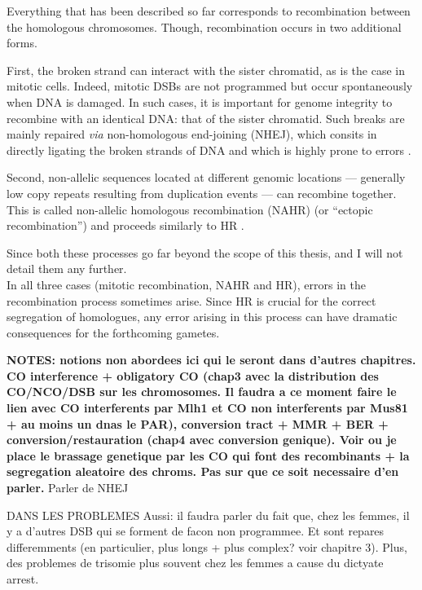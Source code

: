 Everything that has been described so far corresponds to recombination between the homologous chromosomes. 
Though, recombination occurs in two additional forms.

First, the broken strand can interact with the sister chromatid, as is the case in mitotic cells. 
Indeed, mitotic DSBs are not programmed but occur spontaneously when DNA is damaged.
In such cases, it is important for genome integrity to recombine with an identical DNA\@: that of the sister chromatid. 
Such breaks are mainly repaired \textit{via} non-homologous end-joining (NHEJ), which consits in directly ligating the broken strands of DNA \citep{weterings2004mechanism} and which is highly prone to errors \citep{smith2001influence}.

Second, non-allelic sequences located at different genomic locations — generally low copy repeats resulting from duplication events \citep{bailey2006primate} — can recombine together. 
This is called non-allelic homologous recombination (NAHR) (or “ectopic recombination”) and proceeds similarly to HR \citep{sasaki2010genome}.

Since both these processes go far beyond the scope of this thesis, and I will not detail them any further.\\

In all three cases (mitotic recombination, NAHR and HR), errors in the recombination process sometimes arise. 
Since HR is crucial for the correct segregation of homologues, any error arising in this process can have dramatic consequences for the forthcoming gametes.




\textbf{NOTES\@: notions non abordees ici qui le seront dans d'autres chapitres. CO interference + obligatory CO (chap3 avec la distribution des CO/NCO/DSB sur les chromosomes. Il faudra a ce moment faire le lien avec CO interferents par Mlh1 et CO non interferents par Mus81 + au moins un dnas le PAR), conversion tract + MMR + BER + conversion/restauration (chap4 avec conversion genique). Voir ou je place le brassage genetique par les CO qui font des recombinants + la segregation aleatoire des chroms. Pas sur que ce soit necessaire d'en parler.}
Parler de NHEJ



DANS LES PROBLEMES
Aussi: il faudra parler du fait que, chez les femmes, il y a d'autres DSB qui se forment de facon non programmee. Et sont repares differemments (en particulier, plus longs + plus complex? voir chapitre 3). Plus, des problemes de trisomie plus souvent chez les femmes a cause du dictyate arrest.

